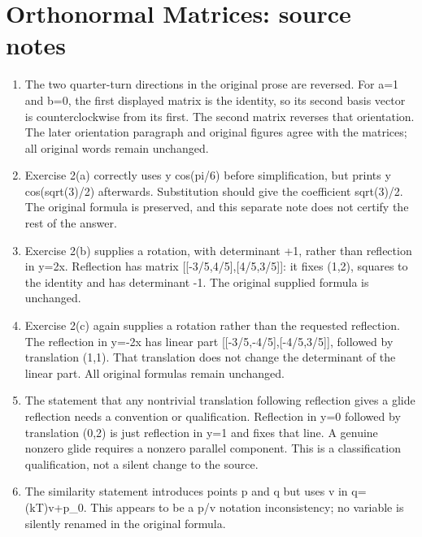 \section*{Orthonormal Matrices: source notes}
\begin{enumerate}
\item The two quarter-turn directions in the original prose are reversed. For a=1 and b=0, the first displayed matrix is the identity, so its second basis vector is counterclockwise from its first. The second matrix reverses that orientation. The later orientation paragraph and original figures agree with the matrices; all original words remain unchanged.
\item Exercise 2(a) correctly uses y cos(pi/6) before simplification, but prints y cos(sqrt(3)/2) afterwards. Substitution should give the coefficient sqrt(3)/2. The original formula is preserved, and this separate note does not certify the rest of the answer.
\item Exercise 2(b) supplies a rotation, with determinant +1, rather than reflection in y=2x. Reflection has matrix [[-3/5,4/5],[4/5,3/5]]: it fixes (1,2), squares to the identity and has determinant -1. The original supplied formula is unchanged.
\item Exercise 2(c) again supplies a rotation rather than the requested reflection. The reflection in y=-2x has linear part [[-3/5,-4/5],[-4/5,3/5]], followed by translation (1,1). That translation does not change the determinant of the linear part. All original formulas remain unchanged.
\item The statement that any nontrivial translation following reflection gives a glide reflection needs a convention or qualification. Reflection in y=0 followed by translation (0,2) is just reflection in y=1 and fixes that line. A genuine nonzero glide requires a nonzero parallel component. This is a classification qualification, not a silent change to the source.
\item The similarity statement introduces points p and q but uses v in q=(kT)v+p\_0. This appears to be a p/v notation inconsistency; no variable is silently renamed in the original formula.
\end{enumerate}
